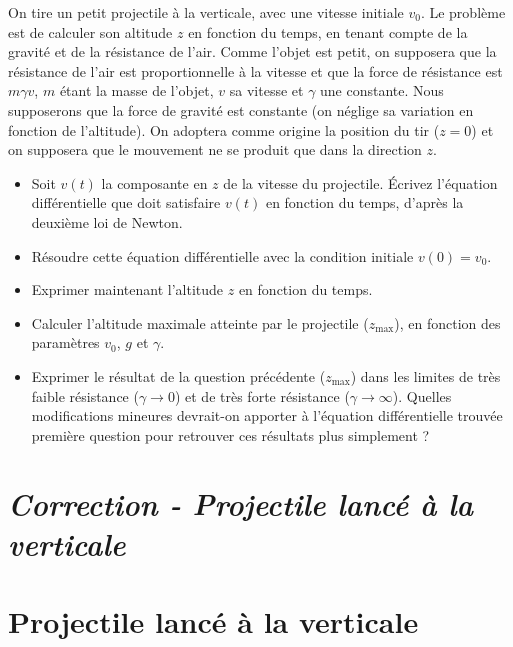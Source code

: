 \documentclass{report}
\begin{document}
On tire un petit projectile à la verticale, avec une vitesse initiale $v_0$. Le problème est de calculer son altitude $z$ en fonction du temps, en tenant compte de la gravité et de la résistance de l'air. Comme l'objet est petit, on supposera que la résistance de l'air est proportionnelle à la vitesse et que la force de résistance est $m\gamma v$, $m$ étant la masse de l'objet, $v$ sa vitesse et $\gamma$ une constante. Nous supposerons que la force de gravité est constante (on néglige sa variation en fonction de l'altitude). On adoptera comme origine la position du tir ($z=0$) et on supposera que le mouvement ne se produit que dans la direction $z$.

\begin{itemize}
\item Soit $v(t)$ la composante en $z$ de la vitesse du projectile. \'{E}crivez l'équation différentielle que doit satisfaire $v(t)$ en fonction du temps, d'après la deuxième loi de Newton.
\item Résoudre cette équation différentielle avec la condition initiale $v(0)=v_0$.
\item Exprimer maintenant l'altitude $z$ en fonction du temps.
\item Calculer l'altitude maximale atteinte par le projectile ($z_\mathrm{max}$), en fonction des paramètres $v_0$, $g$ et $\gamma$.
\item Exprimer le résultat de la question précédente ($z_\mathrm{max}$) dans les limites de très faible résistance ($\gamma \rightarrow 0$) et de très forte résistance ($\gamma \rightarrow \infty$). Quelles modifications mineures devrait-on apporter à l'équation différentielle trouvée première question pour retrouver ces résultats plus simplement ?

\end{itemize}

\newpage

\section*{\textit{Correction - Projectile lancé à la verticale}}

\section*{Projectile lancé à la verticale}
\end{document}
